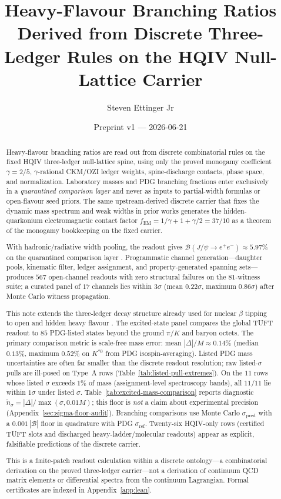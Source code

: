 \documentclass[11pt]{amsart}
\title[Heavy-flavour branching from discrete three-ledger rules]{Heavy-Flavour Branching Ratios Derived from Discrete Three-Ledger Rules on the {HQIV} Null-Lattice Carrier}
\author{Steven Ettinger Jr}
\date{Preprint v1 --- 2026-06-21}
\begin{document}
\begin{abstract}
Heavy-flavour branching ratios are read out from discrete combinatorial rules on
the fixed HQIV three-ledger null-lattice spine, using only the proved monogamy
coefficient $\gamma=2/5$, $\gamma$-rational CKM/OZI ledger weights,
spine-discharge contacts, phase space, and normalization.
Laboratory masses and PDG branching fractions enter exclusively in a
\emph{quarantined comparison layer} and never as inputs to partial-width formulas
or open-flavour seed priors.
The same upstream-derived discrete carrier that fixes the dynamic mass spectrum
and weak widths in prior works generates the hidden-quarkonium electromagnetic
contact factor $f_{\mathrm{EM}}=1/\gamma+1+\gamma/2=37/10$ as a theorem of the
monogamy bookkeeping on the fixed carrier.

With hadronic/radiative width pooling, the readout gives
$\mathcal{B}(J/\psi\to e^+e^-)\approx 5.97\%$ on the quarantined comparison layer
\cite{pdg2024,augustin1974,peskin1995,schwartz2014}.
Programmatic channel generation---daughter pools, kinematic filter, ledger
assignment, and property-generated spanning sets---produces $567$ open-channel
readouts with zero structural failures on the $81$-witness suite; a curated panel
of $17$ channels lies within $3\sigma$ (mean $0.22\sigma$, maximum $0.86\sigma$)
after Monte Carlo witness propagation.

This note extends the three-ledger decay structure already used for nuclear
$\beta$ tipping \cite{hqiv-nucleon-binding-paper} to open and hidden heavy flavour
\cite{NielsenTUFT2026,hqiv-tuft-sm-lagrangian-paper,hqiv-gluon-curvature-note}.
The excited-state panel compares the global TUFT readout to $85$ PDG-listed states
beyond the ground $\pi/K$ and baryon octets.
The primary comparison metric is scale-free mass error:
mean $|\Delta|/M \approx 0.14\%$ (median $0.13\%$, maximum $0.52\%$ on $K^{*0}$ from PDG isospin-averaging).
Listed PDG mass uncertainties are often far smaller than the discrete readout
resolution; raw listed-$\sigma$ pulls are ill-posed on Type~A rows
(Table~\ref{tab:listed-pull-extremes}).
On the $11$ rows whose listed $\sigma$ exceeds $1\%$ of mass (assignment-level
spectroscopy bands), all $11/11$ lie within $1\sigma$ under listed $\sigma$.
Table~\ref{tab:excited-mass-comparison} reports diagnostic
$\tilde n_\sigma=|\Delta|/\max(\sigma,0.01M)$; this floor is \emph{not} a claim about
experimental precision (Appendix~\ref{sec:sigma-floor-audit}).
Branching comparisons use Monte Carlo $\sigma_{\mathrm{pred}}$ with a
$0.001\,|\mathcal{B}|$ floor in quadrature with PDG $\sigma_{\mathrm{ref}}$.
Twenty-six HQIV-only rows (certified TUFT slots and discharged heavy-ladder/molecular
readouts) appear as explicit, falsifiable predictions of the discrete carrier.

This is a finite-patch readout calculation within a discrete ontology---a
combinatorial derivation on the proved three-ledger carrier---not a derivation of
continuum QCD matrix elements or differential spectra from the continuum
Lagrangian.
Formal certificates are indexed in Appendix~\ref{app:lean}.
\end{abstract}
\end{document}
